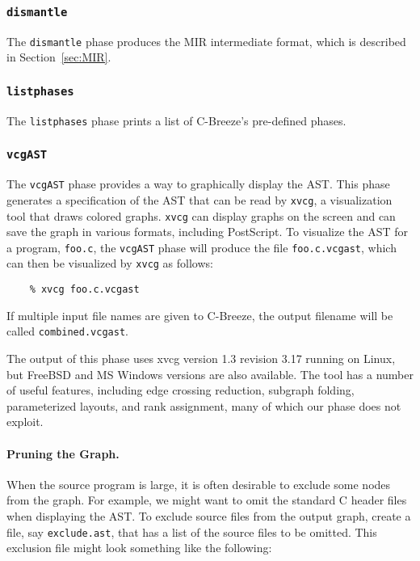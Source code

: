 \documentclass[10pt]{article}
\begin{document}
\subsubsection{{\tt dismantle}}

The {\tt dismantle} phase produces the MIR intermediate format, which
is described in Section~\ref{sec:MIR}.  



\subsubsection{{\tt listphases}}

The {\tt listphases} phase prints a list of C-Breeze's pre-defined phases.


\subsubsection{{\tt vcgAST}}

The {\tt vcgAST} phase provides a way to graphically display the AST.  This
phase generates a specification of the AST that can be read by {\tt xvcg}, a
visualization tool that draws colored graphs.  {\tt xvcg} can display graphs
on the screen and can save the graph in various formats, including
PostScript.  To visualize the AST for a program, {\tt foo.c}, the
{\tt vcgAST} phase will produce the file {\tt foo.c.vcgast}, which can
then be visualized by {\tt xvcg} as follows:

\begin{small}
\begin{verbatim}
    % xvcg foo.c.vcgast
\end{verbatim}
\end{small}

\noindent
If multiple input file names are given to C-Breeze, the output filename
will be called {\tt combined.vcgast}.

The output of this phase uses xvcg version 1.3 revision 3.17 running on
Linux, but FreeBSD and MS Windows versions are also available.  The tool has
a number of useful features, including edge crossing reduction, subgraph
folding, parameterized layouts, and rank assignment, many of which our phase
does not exploit.

\paragraph{Pruning the Graph.}
When the source program is large, it is often desirable to exclude some 
nodes from the graph.  For example, we might want to omit the standard C
header files when displaying the AST.  To exclude source files from the
output graph, create a file, say {\tt exclude.ast}, that has
a list of the source files to be omitted.  This exclusion file might look
something like the following:
\end{document}
